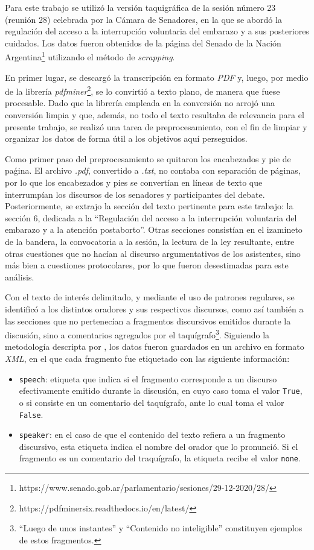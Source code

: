 Para este trabajo se utilizó la versión taquigráfica de la sesión número
23 (reunión 28) celebrada por la Cámara de Senadores, en la que se abordó la
regulación del acceso a la interrupción voluntaria del embarazo y a sus
posteriores cuidados. Los datos fueron obtenidos de la página del Senado de la Nación
Argentina\footnote{https://www.senado.gob.ar/parlamentario/sesiones/29-12-2020/28/}
utilizando el método de \textit{scrapping}.\par
En primer lugar, se descargó la transcripción en formato \textit{PDF} y, luego, por
medio de la librería \textit{pdfminer}\footnote{https://pdfminersix.readthedocs.io/en/latest/},
se lo convirtió a texto plano, de manera que fuese procesable. Dado que la librería
empleada en la conversión no arrojó una conversión limpia y que, además, no todo el texto
resultaba de relevancia para el presente trabajo, se realizó una tarea de
preprocesamiento, con el fin de limpiar y organizar los datos de forma útil a los
objetivos aquí perseguidos.\par
Como primer paso del preprocesamiento se quitaron los encabezados y pie de paǵina.
El archivo \textit{.pdf}, convertido a \textit{.txt}, no contaba con separación de
páginas, por lo que los encabezados y pies se convertían en líneas de texto que
interrumpían los discursos de los senadores y participantes del debate.
Posteriormente, se extrajo la sección del texto pertinente para este trabajo:
la sección 6, dedicada a la ``Regulación  del  acceso  a  la  interrupción
voluntaria  del  embarazo  y  a  la atención postaborto''. Otras secciones consistían
en el izamineto de la bandera, la convocatoria a la sesión, la lectura de la ley
resultante, entre otras cuestiones que no hacían al discurso argumentativos de los
asistentes, sino más bien a cuestiones protocolares, por lo que fueron desestimadas
para este análisis.\par
Con el texto de interés delimitado, y mediante el uso de patrones regulares, se
identificó a los distintos oradores y sus respectivos discursos, como así también
a las secciones que no pertenecían a fragmentos discursivos emitidos durante la
discusión, sino a comentarios agregados por el taquígrafo\footnote{``Luego de unos
instantes'' y ``Contenido no inteligible'' constituyen ejemplos de estos
fragmentos.}. Siguiendo la metodología descripta por \cite{monroe2008fightin},
los datos fueron guardados en un archivo en formato \textit{XML}, en el que
cada fragmento fue etiquetado con las siguiente información:
\begin{itemize}
    \item \texttt{speech}: etiqueta que indica si el fragmento corresponde a un
    discurso efectivamente emitido durante la discusión, en cuyo caso toma el
    valor \texttt{True}, o si consiste en un comentario del taquígrafo, ante lo cual
    toma el valor \texttt{False}.
    \item \texttt{speaker}: en el caso de que el contenido del texto refiera a
    un fragmento discursivo, esta etiqueta indica el nombre del orador que lo
    pronunció. Si el fragmento es un comentario del traquígrafo, la etiqueta
    recibe el valor \texttt{none}.
\end{itemize}
